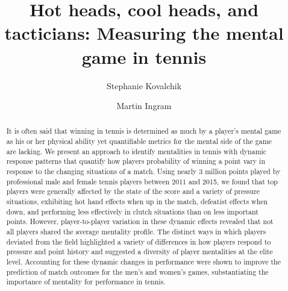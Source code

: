 \documentclass{Latex/svjour3}
\begin{document}
\title{Hot heads, cool heads, and tacticians: Measuring the mental
  game in tennis}



\author{Stephanie Kovalchik\and Martin Ingram}


\date{}


\maketitle

\begin{abstract}
It is often said that winning in tennis is determined as much by a player's
mental game as his or her physical ability yet quantifiable metrics for the
mental side of the game are lacking. We present an approach to identify
mentalities in tennis with dynamic response patterns that quantify how players
probability of winning a point vary in response to the changing situations of a
match. Using nearly 3 million points played by professional male and female
tennis players between 2011 and 2015, we found that top players were generally
affected by the state of the score and a variety of pressure situations,
exhibiting hot hand effects when up in the match, defeatist effects when down,
and performing less effectively in clutch situations than on less important
points. However, player-to-player variation in these dynamic effects revealed
that not all players shared the average mentality profile. The distinct ways in
which players deviated from the field highlighted a variety of differences in
how players respond to pressure and point history and suggested a diversity of
player mentalities at the elite level. Accounting for these dynamic changes in
performance were shown to improve the prediction of match outcomes for the men's
and women's games, substantiating the importance of mentality for performance in
tennis.


\end{abstract}
\end{document}
